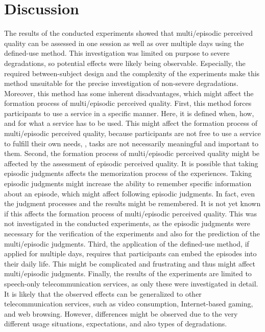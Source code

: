 \section{Discussion}
The results of the conducted experiments showed that multi\-/episodic perceived quality can be assessed in one session as well as over multiple days using the defined-use method.
This investigation was limited on purpose to severe degradations, so potential effects were likely being observable.
Especially, the required between-subject design and the complexity of the experiments make this method unsuitable for the precise investigation of non-severe degradations.
Moreover, this method has some inherent disadvantages, which might affect the formation process of multi\-/episodic perceived quality.
First, this method forces participants to use a service in a specific manner.
Here, it is defined when, how, and for what a service has to be used.
This might affect the formation process of  multi\-/episodic perceived quality, because participants are not free to use a service to fulfill their own needs, \ie, tasks are not necessarily meaningful and important to them.
Second, the formation process of multi\-/episodic perceived quality might be affected by the assessment of episodic perceived quality.
It is possible that taking episodic judgments affects the memorization process of the experiences.
Taking episodic judgments might increase the ability to remember specific information about an episode, which might affect following episodic judgments.
In fact, even the judgment processes and the results might be remembered.
It is not yet known if this affects the formation process of multi\-/episodic perceived quality.
This was not investigated in the conducted experiments, as the episodic judgments were necessary for the verification of the experiments and also for the prediction of the multi\-/episodic judgments.
Third, the application of the defined-use method, if applied for multiple days, requires that participants can embed the episodes into their daily life.
This might be complicated and frustrating and thus might affect multi\-/episodic judgments.
Finally, the results of the experiments are limited to speech-only telecommunication services, as only these were investigated in detail.
It is likely that the observed effects can be generalized to other telecommunication services, such as video consumption, Internet-based gaming, and web browsing.
However, differences might be observed due to the very different usage situations, expectations, and also types of degradations.

